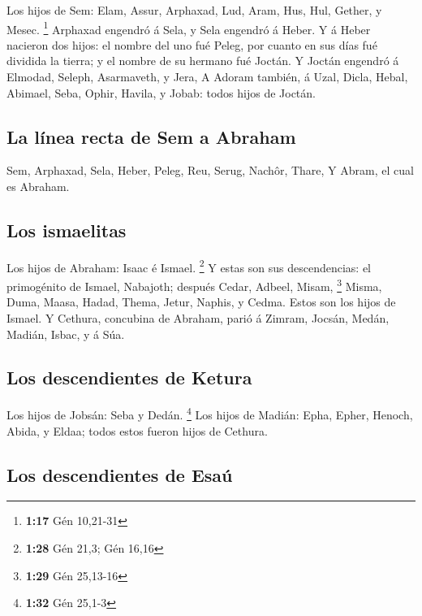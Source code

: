  Los hijos de Sem: Elam, Assur, Arphaxad, Lud, Aram, Hus,
Hul, Gether, y Mesec. \footnote{\textbf{1:17} Gén 10,21-31}
 Arphaxad engendró á Sela, y Sela engendró á Heber.
 Y á Heber nacieron dos hijos: el nombre del uno fué
Peleg, por cuanto en sus días fué dividida la tierra; y el nombre de su
hermano fué Joctán.  Y Joctán engendró á Elmodad, Seleph,
Asarmaveth, y Jera,  A Adoram también, á Uzal, Dicla,
 Hebal, Abimael, Seba,  Ophir, Havila, y
Jobab: todos hijos de Joctán.

\hypertarget{la-luxednea-recta-de-sem-a-abraham}{%
\subsection{La línea recta de Sem a
Abraham}\label{la-luxednea-recta-de-sem-a-abraham}}

 Sem, Arphaxad, Sela,  Heber, Peleg, Reu,
 Serug, Nachôr, Thare,  Y Abram, el cual
es Abraham.

\hypertarget{los-ismaelitas}{%
\subsection{Los ismaelitas}\label{los-ismaelitas}}

 Los hijos de Abraham: Isaac é Ismael. \footnote{\textbf{1:28}
  Gén 21,3; Gén 16,16}  Y estas son sus descendencias: el
primogénito de Ismael, Nabajoth; después Cedar, Adbeel, Misam,
\footnote{\textbf{1:29} Gén 25,13-16}  Misma, Duma,
Maasa, Hadad, Thema, Jetur, Naphis, y Cedma. Estos son los hijos de
Ismael.  Y Cethura, concubina de Abraham, parió á Zimram,
Jocsán, Medán, Madián, Isbac, y á Súa.

\hypertarget{los-descendientes-de-ketura}{%
\subsection{Los descendientes de
Ketura}\label{los-descendientes-de-ketura}}

 Los hijos de Jobsán: Seba y Dedán. \footnote{\textbf{1:32}
  Gén 25,1-3}  Los hijos de Madián: Epha, Epher, Henoch,
Abida, y Eldaa; todos estos fueron hijos de Cethura.

\hypertarget{los-descendientes-de-esauxfa}{%
\subsection{Los descendientes de
Esaú}\label{los-descendientes-de-esauxfa}}

